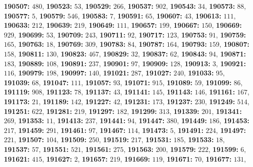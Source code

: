\textsf{\bfseries 190507:} $480$, \textsf{\bfseries 190523:} $53$, \textsf{\bfseries 190529:} $266$, \textsf{\bfseries 190537:} $902$, \textsf{\bfseries 190543:} $34$, \textsf{\bfseries 190573:} $88$, \textsf{\bfseries 190577:} $5$, \textsf{\bfseries 190579:} $546$, \textsf{\bfseries 190583:} $7$, \textsf{\bfseries 190591:} $65$, \textsf{\bfseries 190607:} $43$, \textsf{\bfseries 190613:} $111$, \textsf{\bfseries 190633:} $212$, \textsf{\bfseries 190639:} $219$, \textsf{\bfseries 190649:} $111$, \textsf{\bfseries 190657:} $199$, \textsf{\bfseries 190667:} $150$, \textsf{\bfseries 190669:} $929$, \textsf{\bfseries 190699:} $53$, \textsf{\bfseries 190709:} $243$, \textsf{\bfseries 190711:} $92$, \textsf{\bfseries 190717:} $123$, \textsf{\bfseries 190753:} $91$, \textsf{\bfseries 190759:} $165$, \textsf{\bfseries 190763:} $18$, \textsf{\bfseries 190769:} $309$, \textsf{\bfseries 190783:} $84$, \textsf{\bfseries 190787:} $164$, \textsf{\bfseries 190793:} $159$, \textsf{\bfseries 190807:} $158$, \textsf{\bfseries 190811:} $130$, \textsf{\bfseries 190823:} $467$, \textsf{\bfseries 190829:} $32$, \textsf{\bfseries 190837:} $62$, \textsf{\bfseries 190843:} $94$, \textsf{\bfseries 190871:} $183$, \textsf{\bfseries 190889:} $108$, \textsf{\bfseries 190891:} $237$, \textsf{\bfseries 190901:} $97$, \textsf{\bfseries 190909:} $128$, \textsf{\bfseries 190913:} $3$, \textsf{\bfseries 190921:} $116$, \textsf{\bfseries 190979:} $198$, \textsf{\bfseries 190997:} $140$, \textsf{\bfseries 191021:} $287$, \textsf{\bfseries 191027:} $240$, \textsf{\bfseries 191033:} $95$, \textsf{\bfseries 191039:} $68$, \textsf{\bfseries 191047:} $111$, \textsf{\bfseries 191057:} $93$, \textsf{\bfseries 191071:} $915$, \textsf{\bfseries 191089:} $59$, \textsf{\bfseries 191099:} $86$, \textsf{\bfseries 191119:} $908$, \textsf{\bfseries 191123:} $78$, \textsf{\bfseries 191137:} $43$, \textsf{\bfseries 191141:} $145$, \textsf{\bfseries 191143:} $146$, \textsf{\bfseries 191161:} $167$, \textsf{\bfseries 191173:} $21$, \textsf{\bfseries 191189:} $142$, \textsf{\bfseries 191227:} $42$, \textsf{\bfseries 191231:} $173$, \textsf{\bfseries 191237:} $230$, \textsf{\bfseries 191249:} $514$, \textsf{\bfseries 191251:} $622$, \textsf{\bfseries 191281:} $219$, \textsf{\bfseries 191297:} $182$, \textsf{\bfseries 191299:} $313$, \textsf{\bfseries 191339:} $201$, \textsf{\bfseries 191341:} $269$, \textsf{\bfseries 191353:} $11$, \textsf{\bfseries 191413:} $237$, \textsf{\bfseries 191441:} $94$, \textsf{\bfseries 191447:} $380$, \textsf{\bfseries 191449:} $186$, \textsf{\bfseries 191453:} $217$, \textsf{\bfseries 191459:} $291$, \textsf{\bfseries 191461:} $97$, \textsf{\bfseries 191467:} $114$, \textsf{\bfseries 191473:} $5$, \textsf{\bfseries 191491:} $224$, \textsf{\bfseries 191497:} $221$, \textsf{\bfseries 191507:} $104$, \textsf{\bfseries 191509:} $250$, \textsf{\bfseries 191519:} $217$, \textsf{\bfseries 191531:} $185$, \textsf{\bfseries 191533:} $18$, \textsf{\bfseries 191537:} $57$, \textsf{\bfseries 191551:} $521$, \textsf{\bfseries 191561:} $275$, \textsf{\bfseries 191563:} $200$, \textsf{\bfseries 191579:} $222$, \textsf{\bfseries 191599:} $6$, \textsf{\bfseries 191621:} $415$, \textsf{\bfseries 191627:} $2$, \textsf{\bfseries 191657:} $219$, \textsf{\bfseries 191669:} $119$, \textsf{\bfseries 191671:} $70$, \textsf{\bfseries 191677:} $131$, 
